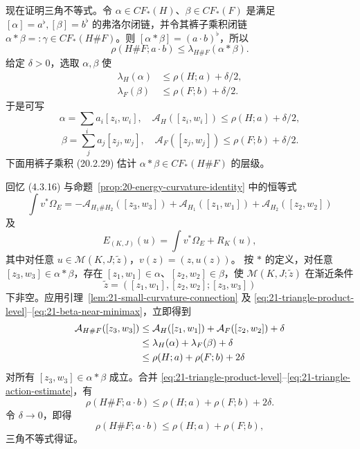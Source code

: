 现在证明三角不等式。令 $\alpha\in CF_*(H)$、$\beta\in CF_*(F)$ 是满足
$[\alpha]=a^\flat,[\beta]=b^\flat$ 的弗洛尔闭链，并令其裤子乘积闭链
$\alpha*\beta=:\gamma\in CF_*(H\#F)$。则
$[\alpha*\beta]=(a\cdot b)^\flat$，所以
\begin{equation}
 \rho(H\#F;a\cdot b)\leq\lambda_{H\#F}(\alpha*\beta).
 \label{eq:21-triangle-product-level}
\end{equation}
给定 $\delta>0$，选取 $\alpha,\beta$ 使
\begin{align}
 \lambda_H(\alpha)&\leq\rho(H;a)+\delta/2,
 \label{eq:21-alpha-near-minimax}\\
 \lambda_F(\beta)&\leq\rho(F;b)+\delta/2.
 \label{eq:21-beta-near-minimax}
\end{align}
于是可写
\[
 \alpha=\sum_i a_i[z_i,w_i],\quad
 \mathcal A_H([z_i,w_i])\leq\rho(H;a)+\delta/2,
\]
\[
 \beta=\sum_j a_j[z_j,w_j],\quad
 \mathcal A_F([z_j,w_j])\leq\rho(F;b)+\delta/2.
\]
下面用裤子乘积 (20.2.29) 估计 $\alpha*\beta\in CF_*(H\#F)$ 的层级。

回忆 (4.3.16) 与命题~\ref{prop:20-energy-curvature-identity} 中的恒等式
\[
 \int v^*\Omega_E=-\mathcal A_{H_1\#H_2}([z_3,w_3])
 +\mathcal A_{H_1}([z_1,w_1])+\mathcal A_{H_2}([z_2,w_2])
\]
及
\[
 E_{(K,J)}(u)=\int v^*\Omega_E+R_K(u),
\]
其中对任意 $u\in\mathcal M(K,J;\widetilde z)$，$v(z)=(z,u(z))$。
按 $*$ 的定义，对任意 $[z_3,w_3]\in\alpha*\beta$，存在
$[z_1,w_1]\in\alpha$、$[z_2,w_2]\in\beta$，使
$\mathcal M(K,J;\widetilde z)$ 在渐近条件
\[
 \widetilde z=([z_1,w_1],[z_2,w_2];[z_3,w_3])
\]
下非空。应用引理~\ref{lem:21-small-curvature-connection} 及
\eqref{eq:21-triangle-product-level}--\eqref{eq:21-beta-near-minimax}，立即得到
\begin{align}
 \mathcal A_{H\#F}([z_3,w_3])
 &\leq\mathcal A_H([z_1,w_1])+\mathcal A_F([z_2,w_2])+\delta\notag\\
 &\leq\lambda_H(\alpha)+\lambda_F(\beta)+\delta\notag\\
 &\leq\rho(H;a)+\rho(F;b)+2\delta
 \label{eq:21-triangle-action-estimate}
\end{align}
对所有 $[z_3,w_3]\in\alpha*\beta$ 成立。合并
\eqref{eq:21-triangle-product-level}--\eqref{eq:21-triangle-action-estimate}，有
\[
 \rho(H\#F;a\cdot b)\leq\rho(H;a)+\rho(F;b)+2\delta.
\]
令 $\delta\to0$，即得
\[
 \rho(H\#F;a\cdot b)\leq\rho(H;a)+\rho(F;b),
\]
三角不等式得证。
